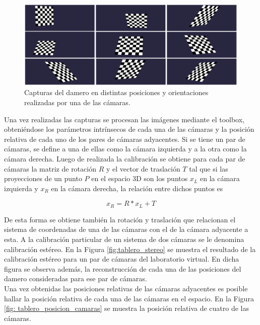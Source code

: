\begin{figure}[ht!]
\begin{center}
\includegraphics[scale=0.08]{img/calibracion/tablero_posiciones.png}
\end{center}
\caption{Capturas del damero en distintas posiciones y orientaciones realizadas por una de las cámaras. }
\label{fig: tablero_posiciones}
\end{figure}


Una vez realizadas las capturas se procesan  las imágenes mediante el toolbox, obteniéndose los parámetros intrínsecos de cada una de las cámaras y la posición relativa de cada uno de los pares de cámaras adyacentes. Si se tiene un par de cámaras, se define a una de ellas como la cámara izquierda y a la otra como la cámara derecha. Luego de realizada la calibración se obtiene para cada par de cámaras la matriz de rotación $R$ y el vector de traslación $T$ tal que si las proyecciones de un punto $P$ en el espacio 3D son los puntos $x_L$ en la cámara izquierda y $x_R$ en la cámara derecha, la relación entre dichos puntos es

\[ x_R = R * 
x_L + T\]

De esta forma se obtiene también la rotación y traslación que relacionan el sistema de coordenadas de una de las cámaras con el de la cámara adyacente a esta. A la calibración particular de un sistema de dos cámaras se le denomina calibración estéreo. En la Figura \ref{fig:tablero_stereo} se muestra el resultado de la calibración estéreo para un par de cámaras del laboratorio virtual. En dicha figura se observa además, la reconstrucción de cada una de las posiciones del damero consideradas para ese par de cámaras.\\

Una vez obtenidas las posiciones relativas de las cámaras adyacentes es posible hallar la posición relativa de cada una de  las cámaras en el espacio. En la Figura  \ref{fig: tablero_posicion_camaras} se muestra la posición relativa de cuatro de las cámaras.

